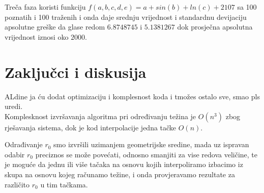 \documentclass[12pt, a4paper]{report}
\theoremstyle{definition}
\begin{document}
	Treča faza koristi funkciju $f(a,b,c,d,e)=a+sin(b)+ln(c)+2107$ sa 100 poznatih i 100 traženih i onda daje srednju vrijednost i standardnu devijaciju apsolutne greške da glase redom $6.8748745$ i $5.1381267$ dok prosječna apsolutna vrijednost iznosi oko $2000$.\\
		
\chapter*{Zaključci i diskusija}

ALdine ja ću dodat optimizaciju i komplesnost koda i tmožes ostalo sve, smao pls uredi.\\
Komplesknost izvršavanja algoritma pri određivanju težina je $O(n^3)$ zbog rješavanja sistema, dok je kod interpolacije jedna tačke $O(n)$.

Odrađivanje $r_0$ smo izvršili uzimanjem geometrijske sredine, mada uz ispravan odabir $r_0$ preciznos se može povećati, odnosno smanjiti za vise redova veličine, te je moguće da jednu ili više tačaka na osnovu kojih interpoliramo izbacimo iz skupa na osnovu kojeg računamo težine, i onda provjeravamo rezultate za različito $r_0$ u tim tačkama.
\end{document}
